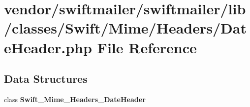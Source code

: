 \section{vendor/swiftmailer/swiftmailer/lib/classes/\+Swift/\+Mime/\+Headers/\+Date\+Header.php File Reference}
\label{_date_header_8php}
\subsection*{Data Structures}
\begin{DoxyCompactItemize}
\item 
class {\bf Swift\+\_\+\+Mime\+\_\+\+Headers\+\_\+\+Date\+Header}
\end{DoxyCompactItemize}
